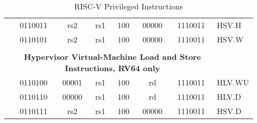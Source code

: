 \begin{table}[p]
\begin{small}
\begin{center}
\begin{tabular}{p{0in}p{0.4in}p{0.05in}p{0.05in}p{0.05in}p{0.05in}p{0.4in}p{0.6in}p{0.4in}p{0.6in}p{0.7in}l}
&
\multicolumn{4}{|c|}{0110011} &
\multicolumn{2}{c|}{rs2} &
\multicolumn{1}{c|}{rs1} &
\multicolumn{1}{c|}{100} &
\multicolumn{1}{c|}{00000} &
\multicolumn{1}{c|}{1110011} & HSV.H \\
\cline{2-11}


&
\multicolumn{4}{|c|}{0110101} &
\multicolumn{2}{c|}{rs2} &
\multicolumn{1}{c|}{rs1} &
\multicolumn{1}{c|}{100} &
\multicolumn{1}{c|}{00000} &
\multicolumn{1}{c|}{1110011} & HSV.W \\
\cline{2-11}


&
\multicolumn{10}{c}{} & \\
&
\multicolumn{10}{c}{\bf Hypervisor Virtual-Machine Load and Store Instructions, RV64 only} & \\
\cline{2-11}


&
\multicolumn{4}{|c|}{0110100} &
\multicolumn{2}{c|}{00001} &
\multicolumn{1}{c|}{rs1} &
\multicolumn{1}{c|}{100} &
\multicolumn{1}{c|}{rd} &
\multicolumn{1}{c|}{1110011} & HLV.WU \\
\cline{2-11}


&
\multicolumn{4}{|c|}{0110110} &
\multicolumn{2}{c|}{00000} &
\multicolumn{1}{c|}{rs1} &
\multicolumn{1}{c|}{100} &
\multicolumn{1}{c|}{rd} &
\multicolumn{1}{c|}{1110011} & HLV.D \\
\cline{2-11}


&
\multicolumn{4}{|c|}{0110111} &
\multicolumn{2}{c|}{rs2} &
\multicolumn{1}{c|}{rs1} &
\multicolumn{1}{c|}{100} &
\multicolumn{1}{c|}{00000} &
\multicolumn{1}{c|}{1110011} & HSV.D \\
\cline{2-11}


\end{tabular}
\end{center}
\end{small}
\caption{RISC-V Privileged Instructions}
\end{table}
  
